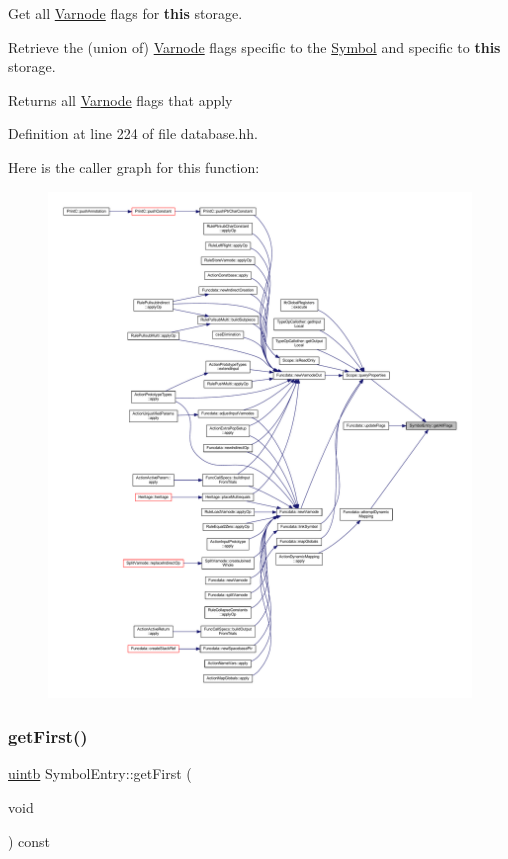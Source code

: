Get all \mbox{\hyperlink{class_varnode}{Varnode}} flags for {\bfseries{this}} storage. 

Retrieve the (union of) \mbox{\hyperlink{class_varnode}{Varnode}} flags specific to the \mbox{\hyperlink{class_symbol}{Symbol}} and specific to {\bfseries{this}} storage. \begin{DoxyReturn}{Returns}
all \mbox{\hyperlink{class_varnode}{Varnode}} flags that apply 
\end{DoxyReturn}


Definition at line 224 of file database.\+hh.

Here is the caller graph for this function\+:
\nopagebreak
\begin{figure}[H]
\begin{center}
\leavevmode
\includegraphics[width=350pt]{class_symbol_entry_a2a9a19cc7c6bfa573fd244bcc061a4a4_icgraph}
\end{center}
\end{figure}
\mbox{\label{class_symbol_entry_af4927191c7a854bde58782700c5a5f63}} 
\subsubsection{\texorpdfstring{getFirst()}{getFirst()}}
{\footnotesize\ttfamily \mbox{\hyperlink{types_8h_a2db313c5d32a12b01d26ac9b3bca178f}{uintb}} Symbol\+Entry\+::get\+First (\begin{DoxyParamCaption}\item[{void}]{ }\end{DoxyParamCaption}) const\hspace{0.3cm}{\ttfamily [inline]}}



